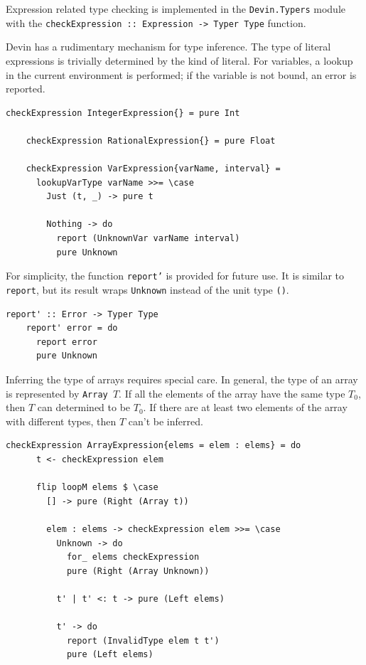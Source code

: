 \documentclass[UdineBachThesis,american,11pt]{PhdThesis}
\begin{document}
  Expression related type checking is implemented in the
  \mbox{\texttt{Devin.Typers}} module with the
  \mbox{\texttt{checkExpression :: Expression -> Typer Type}} function.

  Devin has a rudimentary mechanism for type inference. The type of literal
  expressions is trivially determined by the kind of literal. For variables, a
  lookup in the current environment is performed; if the variable is not bound,
  an error is reported.

  \begin{Verbatim}[gobble=4,fontsize=\small]
    checkExpression IntegerExpression{} = pure Int

    checkExpression RationalExpression{} = pure Float

    checkExpression VarExpression{varName, interval} =
      lookupVarType varName >>= \case
        Just (t, _) -> pure t

        Nothing -> do
          report (UnknownVar varName interval)
          pure Unknown
  \end{Verbatim}

  For simplicity, the function \mbox{\texttt{report'}} is provided for future
  use. It is similar to \mbox{\texttt{report}}, but its result wraps
  \mbox{\texttt{Unknown}} instead of the unit type \mbox{\texttt{()}}.

  \begin{Verbatim}[gobble=4,fontsize=\small]
    report' :: Error -> Typer Type
    report' error = do
      report error
      pure Unknown
  \end{Verbatim}

  Inferring the type of arrays requires special care. In general, the type of an
  array is represented by \mbox{\texttt{Array $T$}}. If all the elements of the
  array have the same type \mbox{$T_0$}, then $T$ can determined to be
  \mbox{$T_0$}. If there are at least two elements of the array with different
  types, then $T$ can't be inferred.

  \begin{Verbatim}[gobble=4,fontsize=\small]
    checkExpression ArrayExpression{elems = elem : elems} = do
      t <- checkExpression elem

      flip loopM elems $ \case
        [] -> pure (Right (Array t))

        elem : elems -> checkExpression elem >>= \case
          Unknown -> do
            for_ elems checkExpression
            pure (Right (Array Unknown))

          t' | t' <: t -> pure (Left elems)

          t' -> do
            report (InvalidType elem t t')
            pure (Left elems)
  \end{Verbatim}
\end{document}
